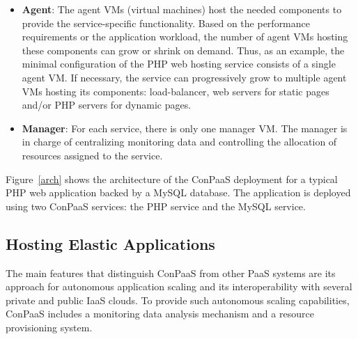 \begin{itemize}
\item \textbf{Agent}: The agent VMs (virtual machines) host the needed components to provide the service-specific functionality. Based on the performance requirements or the application workload, the number of agent VMs hosting these components can grow or shrink on demand. Thus, as an example, the minimal configuration of the PHP web hosting service consists of a single agent VM. If necessary,
the service can progressively grow to multiple agent VMs hosting its components: load-balancer, web servers for static pages and/or PHP servers for dynamic pages. 
\item \textbf{Manager}: For each service, there is only one manager VM. The manager is in charge of centralizing monitoring data and controlling the allocation of resources assigned to the service. 
\end{itemize}

Figure~\ref{arch} shows the architecture of the ConPaaS deployment for a 
typical PHP web application backed by a MySQL database. The application is
deployed using two ConPaaS services: the PHP service and the MySQL service.


\subsection*{Hosting Elastic Applications}

The main features that distinguish ConPaaS from other PaaS systems are its approach for autonomous application scaling and its interoperability with several private and public IaaS clouds. To provide such autonomous scaling capabilities, ConPaaS includes a monitoring data analysis mechanism  and a resource provisioning system.

